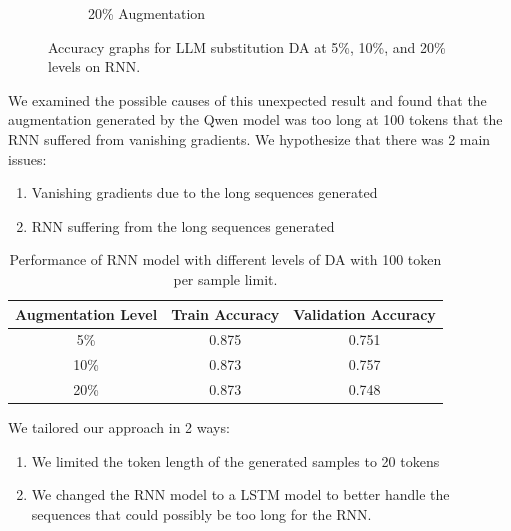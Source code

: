 \documentclass{article}
\begin{document}
\begin{figure}[ht]
\begin{subfigure}[b]{0.3\textwidth}
    \caption{20\% Augmentation}
    \label{fig:llm_20_rnn}
  \end{subfigure}
  \caption{Accuracy graphs for LLM substitution DA at 5\%, 10\%, and 20\% levels on RNN.}
  \label{fig:llm_rnn_substitution_accuracy}
\end{figure}

We examined the possible causes of this unexpected result and found that the
augmentation generated by the Qwen model was too long at 100 tokens that the
RNN suffered from vanishing gradients. We hypothesize that there was 2 main
issues:

\begin{enumerate}
  \item Vanishing gradients due to the long sequences generated
  \item RNN suffering from the long sequences generated
\end{enumerate}

\begin{table}[ht]
  \centering
  \begin{tabular}{|c|c|c|}
    \hline
    \textbf{Augmentation Level} & \textbf{Train Accuracy} & \textbf{Validation Accuracy} \\
    \hline
    5\%                         & 0.875                   & 0.751                        \\
    \hline
    10\%                        & 0.873                   & 0.757                        \\
    \hline
    20\%                        & 0.873                   & 0.748                        \\
    \hline
  \end{tabular}
  \caption{Performance of RNN model with different levels of DA with 100 token per sample limit.}
  \label{table:rnn_performance}
\end{table}

We tailored our approach in 2 ways:

\begin{enumerate}
  \item We limited the token length of the generated samples to 20 tokens
  \item We changed the RNN model to a LSTM model to better handle the sequences that
        could possibly be too long for the RNN.
\end{enumerate}
\end{document}

